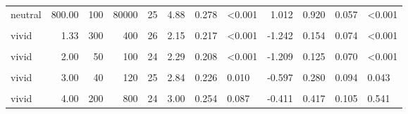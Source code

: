 \documentclass[
]{article}
\begin{document}
\begin{longtable}[t]{lrrrrrrlrrrl}
\hspace{1em}neutral & 800.00 & 100 & 80000 & 25 & 4.88 & 0.278 & <0.001 & 1.012 & 0.920 & 0.057 & <0.001\\
\hspace{1em}\cellcolor{gray!10}{vivid} & \cellcolor{gray!10}{1.33} & \cellcolor{gray!10}{30} & \cellcolor{gray!10}{40} & \cellcolor{gray!10}{26} & \cellcolor{gray!10}{1.77} & \cellcolor{gray!10}{0.163} & \cellcolor{gray!10}{<0.001} & \cellcolor{gray!10}{-2.123} & \cellcolor{gray!10}{0.038} & \cellcolor{gray!10}{0.039} & \cellcolor{gray!10}{<0.001}\\
\hspace{1em}vivid & 1.33 & 300 & 400 & 26 & 2.15 & 0.217 & <0.001 & -1.242 & 0.154 & 0.074 & <0.001\\
\hspace{1em}\cellcolor{gray!10}{vivid} & \cellcolor{gray!10}{2.00} & \cellcolor{gray!10}{20} & \cellcolor{gray!10}{40} & \cellcolor{gray!10}{27} & \cellcolor{gray!10}{2.44} & \cellcolor{gray!10}{0.175} & \cellcolor{gray!10}{<0.001} & \cellcolor{gray!10}{-1.184} & \cellcolor{gray!10}{0.148} & \cellcolor{gray!10}{0.071} & \cellcolor{gray!10}{<0.001}\\
\hspace{1em}vivid & 2.00 & 50 & 100 & 24 & 2.29 & 0.208 & <0.001 & -1.209 & 0.125 & 0.070 & <0.001\\
\hspace{1em}\cellcolor{gray!10}{vivid} & \cellcolor{gray!10}{3.00} & \cellcolor{gray!10}{10} & \cellcolor{gray!10}{30} & \cellcolor{gray!10}{25} & \cellcolor{gray!10}{2.76} & \cellcolor{gray!10}{0.245} & \cellcolor{gray!10}{0.006} & \cellcolor{gray!10}{-0.617} & \cellcolor{gray!10}{0.240} & \cellcolor{gray!10}{0.089} & \cellcolor{gray!10}{0.015}\\
\hspace{1em}vivid & 3.00 & 40 & 120 & 25 & 2.84 & 0.226 & 0.010 & -0.597 & 0.280 & 0.094 & 0.043\\
\hspace{1em}\cellcolor{gray!10}{vivid} & \cellcolor{gray!10}{4.00} & \cellcolor{gray!10}{20} & \cellcolor{gray!10}{80} & \cellcolor{gray!10}{25} & \cellcolor{gray!10}{3.08} & \cellcolor{gray!10}{0.256} & \cellcolor{gray!10}{0.121} & \cellcolor{gray!10}{-0.334} & \cellcolor{gray!10}{0.400} & \cellcolor{gray!10}{0.102} & \cellcolor{gray!10}{0.424}\\
\hspace{1em}vivid & 4.00 & 200 & 800 & 24 & 3.00 & 0.254 & 0.087 & -0.411 & 0.417 & 0.105 & 0.541\\

\end{longtable}
\end{document}
